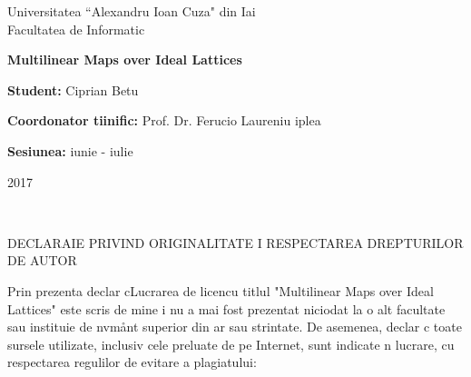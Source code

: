 \begin{titlepage}
	
	\begin{center}
		Universitatea ``Alexandru Ioan Cuza" din Ia\sh i\\
		Facultatea de Informatic\ua\\
	\end{center}
	
	\vspace{80mm}
	
	\begin{center}
		\begin{Huge}
			\textbf{Multilinear Maps over Ideal Lattices}
		\end{Huge}
	\end{center}
	
	\vspace{60mm}
	
	\textbf{Student:} Ciprian B\ua etu
	
	\textbf{Coordonator \sh tiin\tz ific:} Prof. Dr. Ferucio Lauren\tz iu \Tz iplea
	
	\vfill
	
	\begin{center}
		\textbf{Sesiunea:} iunie - iulie
		
		2017
	\end{center}
	
\end{titlepage}
\newpage

\


\vspace{10mm}
\begin{large}
	\begin{center}
		DECLARA\Tz IE PRIVIND ORIGINALITATE \Sh I RESPECTAREA DREPTURILOR DE AUTOR
	\end{center}
\end{large}

\vspace{20mm}

Prin prezenta declar c\ua \space Lucrarea de licen\tz \ua \space cu titlul "Multilinear Maps over Ideal Lattices" este scris{\ua} de mine \sh i nu a mai fost prezentat{\ua}  niciodat{\ua} la o alt{\ua} facultate sau institu\tz ie de \ii nv\ua \tz \ua m\aa nt superior din \tz ar{\ua} sau str\ua in\ua tate. De asemenea, declar c{\ua} toate sursele utilizate, inclusiv cele preluate de pe Internet, sunt indicate \ii n lucrare, cu respectarea regulilor de evitare a plagiatului:

